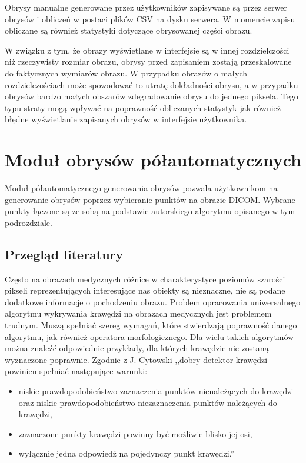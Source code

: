 \documentclass[a4paper,11pt,twoside,openright]{report}
\theoremstyle{definition}
\begin{document}
Obrysy manualne generowane przez użytkowników zapisywane są przez serwer obrysów
i obliczeń w postaci plików CSV na dysku serwera. W momencie zapisu obliczane są
również statystyki dotyczące obrysowanej części obrazu.

W związku z tym, że obrazy wyświetlane w interfejsie są w innej rozdzielczości
niż rzeczywisty rozmiar obrazu, obrysy przed zapisaniem zostają przeskalowane do
faktycznych wymiarów obrazu. W przypadku obrazów o małych rozdzielczościach może
spowodować to utratę dokładności obrysu, a w przypadku obrysów bardzo małych
obszarów zdegradowanie obrysu do jednego piksela. Tego typu straty mogą wpływać
na poprawność obliczanych statystyk jak również błędne wyświetlanie zapisanych
obrysów w interfejsie użytkownika.

\section {Moduł obrysów półautomatycznych}

Moduł półautomatycznego generowania obrysów pozwala użytkownikom na generowanie
obrysów poprzez wybieranie punktów na obrazie DICOM. Wybrane punkty łączone są
ze sobą na podstawie autorskiego algorytmu opisanego w tym podrozdziale.

\subsection {Przegląd literatury}

Często na obrazach medycznych różnice w charakterystyce poziomów szarości pikseli
reprezentujących interesujące nas obiekty są nieznaczne, nie są podane dodatkowe informacje
o pochodzeniu obrazu. Problem opracowania uniwersalnego algorytmu wykrywania krawędzi
na obrazach medycznych jest problemem trudnym. Muszą spełniać szereg wymagań,
które stwierdzają poprawność danego algorytmu, jak również operatora morfologicznego.
Dla wielu takich algorytmów można znaleźć odpowiednie przykłady,
dla których krawędzie nie zostaną wyznaczone poprawnie. Zgodnie z J. Cytowski \cite{Cyfrowe przetwarzanie
obrazów medycznych} ,,dobry detektor krawędzi powinien spełniać następujące warunki:
\begin{itemize}[noitemsep]
\item {niskie prawdopodobieństwo zaznaczenia punktów nienależących do krawędzi
oraz niskie prawdopodobieństwo niezaznaczenia punktów należących do krawędzi,}
\item {zaznaczone punkty krawędzi powinny być możliwie blisko jej osi,}
\item {wyłącznie jedna odpowiedź na pojedynczy punkt krawędzi.''}
\end{itemize}
\end{document}
